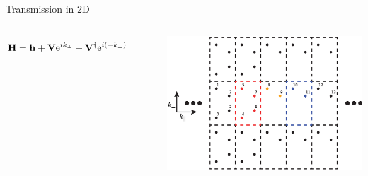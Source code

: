 \documentclass[hyperref={colorlinks=true,urlcolor=blue,linkcolor=.},aspectratio=1610,mathserif]{beamer}
\newcommand{\me}{\mathrm{e}}
\newcommand{\im}[3]{\inputminted[linenos=true, python3=true, firstline=#2, lastline=#3]{python}{#1}}
\begin{document}
\begin{frame}{Transmission in 2D}
\centering
\begin{columns}[c]
		    \begin{align*}
		        \vb{H} = \vb{h} + \vb{V}\me^{ik_{\perp}} + \vb{V}^{\dagger} \me^{i\pqty{-k_{\perp}}}
		    \end{align*}
		    \im{Listings/Functions.py}{250}{253}
			\includegraphics[width=\textwidth]{Figures/2DTrans.eps}
\end{columns}
\end{frame}
\end{document}
